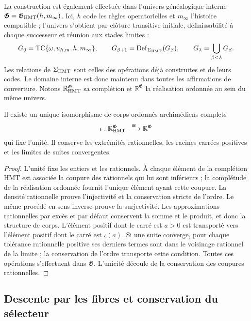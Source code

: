 La construction est également effectuée dans l’univers généalogique interne \(\mathfrak G=\mathfrak G_{\rm HMT}(h,m_\infty)\). Ici, \(h\) code les règles operatorielles et \(m_\infty\) l’histoire compatible ; l’univers s’obtient par clôture transitive initiale, définissabilité à chaque successeur et réunion aux stades limites :
\[
 G_0=\operatorname{TC}\{\omega,u_{h,m},h,m_\infty\},\qquad
 G_{\beta+1}=\operatorname{Def}_{\Sigma_{\rm HMT}}(G_\beta),\qquad
 G_\lambda=\bigcup_{\beta<\lambda}G_\beta .
\]
Les relations de \(\Sigma_{\rm HMT}\) sont celles des opérations déjà construites et de leurs codes. Le domaine interne est donc maintenu dans toutes les affirmations de couverture. Notons \(\mathbb R_{\rm HMT}^{\mathfrak G}\) sa complétion et \(\mathbb R^{\mathfrak G}\) la réalisation ordonnée au sein du même univers.

\begin{proposition}
\label{hmtfg:carta-interna}
Il existe un unique isomorphisme de corps ordonnés archimédiens complets
\[
 \iota:\mathbb R_{\rm HMT}^{\mathfrak G}
             \xrightarrow{\ \cong\ }\mathbb R^{\mathfrak G}
\]
qui fixe l’unité. Il conserve les extrémités rationnelles, les racines carrées positives et les limites de suites convergentes.
\end{proposition}
\begin{proof}
L’unité fixe les entiers et les rationnels. À chaque élément de la complétion HMT est associée la coupure des rationnels qui lui sont inférieurs ; la complétude de la réalisation ordonnée fournit l’unique élément ayant cette coupure. La densité rationnelle prouve l’injectivité et la conservation stricte de l’ordre. Le même procédé en sens inverse prouve la surjectivité. Les approximations rationnelles par excès et par défaut conservent la somme et le produit, et donc la structure de corps. L’élément positif dont le carré est \(a>0\) est transporté vers l’élément positif dont le carré est \(\iota(a)\). Si une suite converge, pour chaque tolérance rationnelle positive ses derniers termes sont dans le voisinage rationnel de la limite ; la conservation de l’ordre transporte cette condition. Toutes ces opérations s’effectuent dans \(\mathfrak G\). L’unicité découle de la conservation des coupures rationnelles.
\end{proof}

\subsection{Descente par les fibres et conservation du sélecteur}
\label{hmtfg:descenso-selector}

